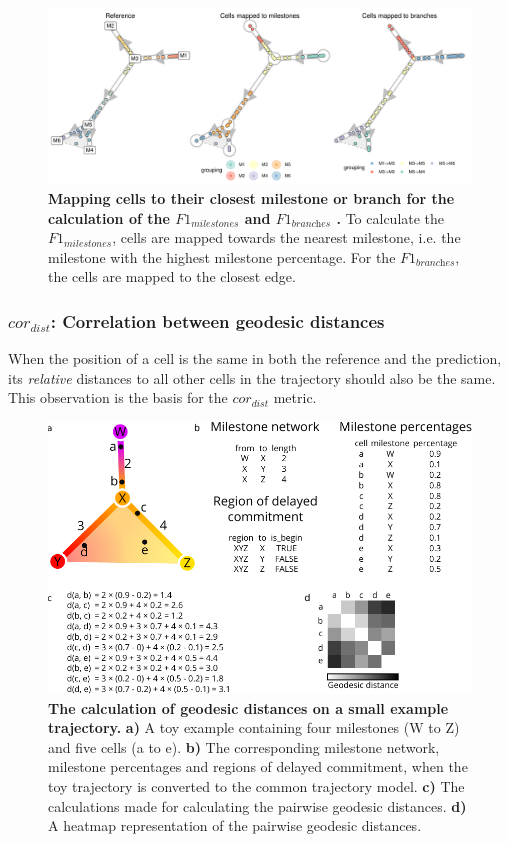 \begin{figure}
	\centering\includegraphics[width=\linewidth]{fig/dynbenchmark/snote1fig_3.pdf}
	\caption{
		\textbf{Mapping cells to their closest milestone or branch for the calculation of the {$\textit{F1}_{\textit{milestones}}$} and {$\textit{F1}_{\textit{branches}}$} .}
		To calculate the {$\textit{F1}_{\textit{milestones}}$}, cells are mapped towards the nearest milestone, i.e. the milestone with the highest milestone percentage. For the {$\textit{F1}_{\textit{branches}}$}, the cells are mapped to the closest edge.
	}
	\label{fig:snote1fig_3}
\end{figure}

\subsubsection{$\textit{cor}_{\textit{dist}}$: Correlation between geodesic distances}

When the position of a cell is the same in both the reference and the prediction, its \textit{relative} distances to all other cells in the trajectory should also be the same. This observation is the basis for the $\textit{cor}_{\textit{dist}}$ metric.

\begin{figure}
	\centering\includegraphics[width=\linewidth]{fig/dynbenchmark/snote1fig_4.pdf}
	\caption{
		\textbf{The calculation of geodesic distances on a small example trajectory.}
		\textbf{a)} A toy example containing four milestones (W to Z) and five cells (a to e). \textbf{b)} The corresponding milestone network, milestone percentages and regions of delayed commitment, when the toy trajectory is converted to the common trajectory model. \textbf{c)} The calculations made for calculating the pairwise geodesic distances. \textbf{d)} A heatmap representation of the pairwise geodesic distances.
	}
	\label{fig:snote1fig_4}
\end{figure}

